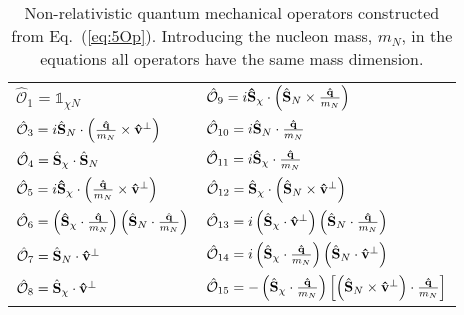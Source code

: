 \documentclass[11pt,a4paper]{article}
\begin{document}
\begin{table}[t]
    \centering
    \begin{tabular}{ll}
    \toprule
        $\hat{\mathcal{O}}_1 = \mathbb{1}_{\chi N}$ & $\hat{\mathcal{O}}_9 = i{\bf{\hat{S}}}_\chi\cdot\left(\hat{{\bf{S}}}_N\times\frac{{\bf{\hat{q}}}}{m_N}\right)$  \\
        $\hat{\mathcal{O}}_3 = i\hat{{\bf{S}}}_N\cdot\left(\frac{{\bf{\hat{q}}}}{m_N}\times{\bf{\hat{v}}}^{\perp}\right)$ \hspace{2 cm} &   $\hat{\mathcal{O}}_{10} = i\hat{{\bf{S}}}_N\cdot\frac{{\bf{\hat{q}}}}{m_N}$   \\
        $\hat{\mathcal{O}}_4 = \hat{{\bf{S}}}_{\chi}\cdot \hat{{\bf{S}}}_{N}$ &   $\hat{\mathcal{O}}_{11} = i{\bf{\hat{S}}}_\chi\cdot\frac{{\bf{\hat{q}}}}{m_N}$   \\                                                                             
        $\hat{\mathcal{O}}_5 = i{\bf{\hat{S}}}_\chi\cdot\left(\frac{{\bf{\hat{q}}}}{m_N}\times{\bf{\hat{v}}}^{\perp}\right)$ &  $\hat{\mathcal{O}}_{12} = \hat{{\bf{S}}}_{\chi}\cdot \left(\hat{{\bf{S}}}_{N} \times{\bf{\hat{v}}}^{\perp} \right)$ \\                                                                                                                 
        $\hat{\mathcal{O}}_6 = \left({\bf{\hat{S}}}_\chi\cdot\frac{{\bf{\hat{q}}}}{m_N}\right) \left(\hat{{\bf{S}}}_N\cdot\frac{\hat{{\bf{q}}}}{m_N}\right)$ &  $\hat{\mathcal{O}}_{13} =i \left(\hat{{\bf{S}}}_{\chi}\cdot {\bf{\hat{v}}}^{\perp}\right)\left(\hat{{\bf{S}}}_{N}\cdot \frac{{\bf{\hat{q}}}}{m_N}\right)$ \\   
        $\hat{\mathcal{O}}_7 = \hat{{\bf{S}}}_{N}\cdot {\bf{\hat{v}}}^{\perp}$ &  $\hat{\mathcal{O}}_{14} = i\left(\hat{{\bf{S}}}_{\chi}\cdot \frac{{\bf{\hat{q}}}}{m_N}\right)\left(\hat{{\bf{S}}}_{N}\cdot {\bf{\hat{v}}}^{\perp}\right)$  \\
        $\hat{\mathcal{O}}_8 = \hat{{\bf{S}}}_{\chi}\cdot {\bf{\hat{v}}}^{\perp}$  & $\hat{\mathcal{O}}_{15} = -\left(\hat{{\bf{S}}}_{\chi}\cdot \frac{{\bf{\hat{q}}}}{m_N}\right)\left[ \left(\hat{{\bf{S}}}_{N}\times {\bf{\hat{v}}}^{\perp} \right) \cdot \frac{{\bf{\hat{q}}}}{m_N}\right] $ \\                                                                               
    \bottomrule
    \end{tabular}
    \caption{Non-relativistic quantum mechanical operators constructed from Eq.~(\ref{eq:5Op}). Introducing the nucleon mass, $m_N$, in the equations all operators have the same mass dimension.} 
    \label{tab:operators}
\end{table}
\end{document}
